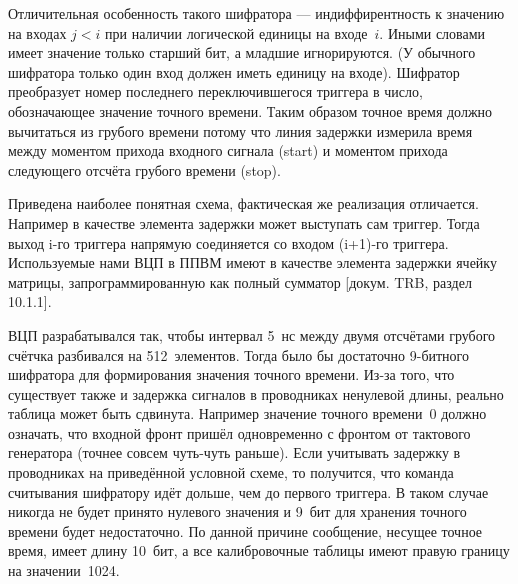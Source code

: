 Отличительная особенность такого шифратора --- индиффирентность к значению на входах $ j<i $ при наличии логической единицы на входе $ i $. Иными словами имеет значение только старший бит, а младшие игнорируются. (У обычного шифратора только один вход должен иметь единицу на входе). Шифратор преобразует номер последнего переключившегося триггера в число, обозначающее значение точного времени. Таким образом точное время должно вычитаться из грубого времени потому что линия задержки измерила время между моментом прихода входного сигнала (start) и моментом прихода следующего отсчёта грубого времени (stop).

Приведена наиболее понятная схема, фактическая же реализация отличается. Например в качестве элемента задержки может выступать сам триггер. Тогда выход i-го триггера напрямую соединяется со входом (i+1)-го триггера. Используемые нами ВЦП в ППВМ имеют в качестве элемента задержки ячейку матрицы, запрограммированную как полный сумматор [докум. TRB, раздел 10.1.1].

ВЦП разрабатывался так, чтобы интервал 5~нс между двумя отсчётами грубого счётчка разбивался на 512~элементов. Тогда было бы достаточно 9-битного шифратора для формирования значения точного времени. Из-за того, что существует также и задержка сигналов в проводниках ненулевой длины, реально таблица может быть сдвинута. Например значение точного времени~0 должно означать, что входной фронт пришёл одновременно с фронтом от тактового генератора (точнее совсем чуть-чуть раньше). Если учитывать задержку в проводниках на приведённой условной схеме, то получится, что команда считывания шифратору идёт дольше, чем до первого триггера. В таком случае никогда не будет принято нулевого значения и 9~бит для хранения точного времени будет недостаточно. По данной причине сообщение, несущее точное время, имеет длину 10~бит, а все калибровочные таблицы имеют правую границу на значении~1024.

